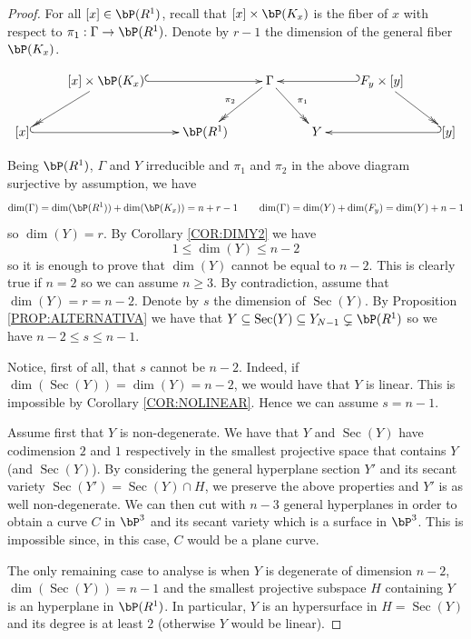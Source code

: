 \documentclass[a4paper,11pt]{amsart}
\DeclareMathOperator{\Sec}{Sec}
\begin{document}
\begin{proof}
For all $[x]\in \bP(R^1)$, recall that $[x]\times \bP(K_x)$ is the fiber of $x$ with respect to $\pi_1:\Gamma\to \bP(R^1)$. Denote by $r-1$ the dimension of the general fiber $\bP(K_x)$.

$$
\xymatrix{
 & [x]\times \bP(K_x) \ar@{->>}[ld]\ar@{^{(}->}[rr] &  & \Gamma \ar@{->>}[dr]^{\pi_1}\ar@{->>}[dl]_{\pi_2} & & F_y\times [y]\ar@{_{(}->}[ll] \ar@{->>}[dr] \\
[x] \ar@{^{(}->}[rr] & & \bP(R^1) & & Y & & [y] \ar@{_{(}->}[ll]
}$$

Being $\bP(R^1)$, $\Gamma$ and $Y$ irreducible and $\pi_1$ and $\pi_2$ in the above diagram surjective by assumption, we have 
$$\dim(\Gamma)=\dim(\bP(R^1))+\dim(\bP(K_x))=n+r-1\qquad \dim(\Gamma)=\dim(Y)+\dim(F_y)=\dim(Y)+n-1$$
so $\dim(Y)=r$. By Corollary \ref{COR:DIMY2} we have $$1\leq \dim(Y)\leq n-2$$ so it is enough to prove that $\dim(Y)$ cannot be equal to $n-2$. This is clearly true if $n=2$ so we can assume $n\geq 3$. By contradiction, assume that $\dim(Y)=r=n-2$. Denote by $s$ the dimension of $\Sec(Y)$. By Proposition \ref{PROP:ALTERNATIVA} we have that $Y\subseteq \Sec(Y)\subseteq Y_{N-1}\subsetneq \bP(R^1)$ so we have $n-2\leq s\leq n-1$.
\vspace{2mm}

Notice, first of all, that $s$ cannot be $n-2$. Indeed, if $\dim(\Sec(Y))=\dim(Y)=n-2$, we would have that $Y$ is linear. This is impossible by Corollary \ref{COR:NOLINEAR}. Hence we can assume $s=n-1$.
\vspace{2mm}

Assume first that $Y$ is non-degenerate. We have that $Y$ and $\Sec(Y)$ have codimension $2$ and $1$ respectively in the smallest projective space that contains $Y$ (and $\Sec(Y)$). By considering the general hyperplane section $Y'$ and its secant variety $\Sec(Y')=\Sec(Y)\cap H$, we preserve the above properties and $Y'$ is as well non-degenerate. We can then cut with $n-3$ general hyperplanes in order to obtain a curve $C$ in $\bP^{3}$ and its secant variety which is a surface in $\bP^3$. This is impossible since, in this case, $C$ would be a plane curve.
\vspace{2mm}

The only remaining case to analyse is when $Y$ is degenerate of dimension $n-2$, $\dim (\Sec(Y))=n-1$ and the smallest projective subspace $H$ containing $Y$ is an hyperplane in $\bP(R^1)$. In particular, $Y$ is an hypersurface in $H=\Sec(Y)$ and its degree is at least $2$ (otherwise $Y$ would be linear).
\vspace{2mm}


\end{proof}
\end{document}
